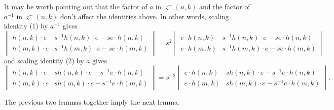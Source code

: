 \begin{remark}
It may be worth pointing out that the factor of $a$ in $\varsigma^+(n, k)$ and the factor of $a^{-1}$ in $\varsigma^-(n, k)$ don't affect the identities above. In other words, scaling identity (1) by $a^{-1}$ gives
\begin{equation}
\begin{vmatrix}
h(n, k) \cdot e & s^{-1} h(n, k) \cdot e - s e \cdot h(n, k) \\
h(m, k) \cdot e & s^{-1} h(m, k) \cdot e - s e \cdot h(m, k)
\end{vmatrix}
= s^2
\begin{vmatrix}
e \cdot h(n, k) & s^{-1} h(n, k) \cdot e - s e \cdot h(n, k) \\
e \cdot h(m, k) & s^{-1} h(m, k) \cdot e - s e \cdot h(m, k)
\end{vmatrix}
\end{equation}
and scaling identity (2) by $a$ gives
\begin{equation}
\begin{vmatrix}
h(n, k) \cdot e &  s h(n, k) \cdot e - s^{-1} e \cdot h(n, k) \\
h(m, k) \cdot e & s h(m, k) \cdot e - s^{-1} e \cdot h(m, k)
\end{vmatrix}
= s^{-2}
\begin{vmatrix}
e \cdot h(n, k) & s h(n, k) \cdot e - s^{-1} e \cdot h(n, k) \\
e \cdot h(m, k) & s h(m, k) \cdot e - s^{-1} e \cdot h(m, k)
\end{vmatrix}.
\end{equation}
\end{remark}

The previous two lemmas together imply the next lemma. 

